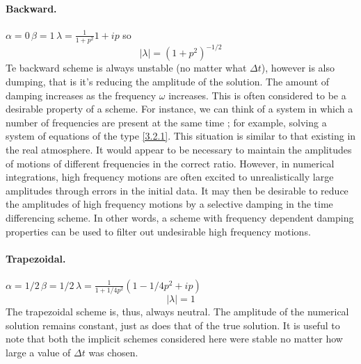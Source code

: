 \paragraph{Backward.} $\alpha=0 \, \beta=1 \, \lambda=\frac{1}{1+p^2}1+ip$
so $$|\lambda|=(1+p^2)^{-1/2}$$
Te backward scheme is always unstable (no matter what $\Delta t$), however is also dumping, that is it's reducing the amplitude of the solution. The amount of damping increases as the frequency $\omega$ increases. This is often considered to be a desirable property of a scheme. For instance, we can think of a system in which a number of frequencies are present at the same time ; for example, solving a system of equations of the type \ref{3.2.1}. This situation is similar to that existing in the real atmosphere. It would appear to be necessary to maintain the amplitudes of motions of different frequencies in the correct ratio. However, in numerical integrations, high frequency motions are often excited to unrealistically large amplitudes through errors in the initial data. It may then be desirable to reduce the amplitudes of high frequency motions by a selective damping in the time differencing scheme. In other words, a scheme with frequency dependent damping properties can be used to filter out undesirable high frequency motions.
\paragraph{Trapezoidal.} $\alpha=1/2 \, \beta=1/2 \, \lambda=\frac{1}{1+1/4p^2}\left(1-1/4p^2+ip\right)$
 $$|\lambda|=1$$
 The trapezoidal scheme is, thus, always neutral. The amplitude of the numerical solution remains constant, just as does that of the true solution. It is useful to note that both the implicit schemes considered here were stable no matter how large a value of $\Delta t$ was chosen.
